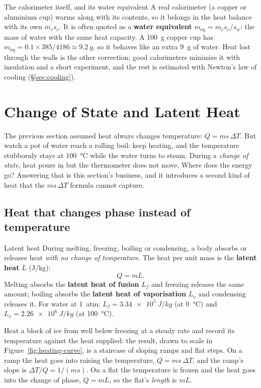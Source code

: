 \begin{remarkbox}{The calorimeter itself, and its water equivalent}
A real calorimeter (a copper or aluminium cup) warms along with its contents, so it belongs in the heat
balance with its own $m_cs_c$. It is often quoted as a \textbf{water equivalent} $m_{\text{eq}}=m_cs_c/s_w$: the
mass of water with the same heat capacity. A \SI{100}{g} copper cup has
$m_{\text{eq}}=0.1\times385/4186\approx\SI{9.2}{g}$, so it behaves like an extra \SI{9}{g} of water. Heat lost
through the walls is the other correction; good calorimeters minimise it with insulation and a short
experiment, and the rest is estimated with Newton's law of cooling (\S\ref{sec:cooling}).
\end{remarkbox}

\section{Change of State and Latent Heat}\label{sec:latent}

The previous section assumed heat always changes temperature: $Q = ms\,\Delta T$. But watch a pot of
water reach a rolling boil: keep heating, and the temperature stubbornly stays at \SI{100}{\celsius}
while the water turns to steam. During a \emph{change of state}, heat pours in but the thermometer does
not move. Where does the energy go? Answering that is this section's business, and it introduces a
second kind of heat that the $ms\,\Delta T$ formula cannot capture.

\subsection{Heat that changes phase instead of temperature}

\begin{defbox}{Latent heat}
During melting, freezing, boiling or condensing, a body absorbs or releases heat \emph{with no change
of temperature}. The heat per unit mass is the \textbf{latent heat} $L$ (\si{J/kg}):
\[ Q = mL. \]
Melting absorbs the \textbf{latent heat of fusion} $L_f$ and freezing releases the same amount;
boiling absorbs the \textbf{latent heat of vaporisation} $L_v$ and condensing releases it. For water at
\SI{1}{atm}: $L_f = \SI{3.34e5}{J/kg}$ (at \SI{0}{\celsius}) and $L_v = \SI{2.26e6}{J/kg}$ (at
\SI{100}{\celsius}).
\end{defbox}

Heat a block of ice from well below freezing at a steady rate and record its temperature against the
heat supplied: the result, drawn to scale in Figure~\ref{fig:heating-curve}, is a staircase of sloping
ramps and flat steps. On a ramp the heat goes into raising the temperature, $Q=ms\,\Delta T$, and the
ramp's slope is $\Delta T/Q=1/(ms)$. On a flat the temperature is frozen and the heat goes into the
change of phase, $Q=mL$, so the flat's \emph{length} is $mL$.

